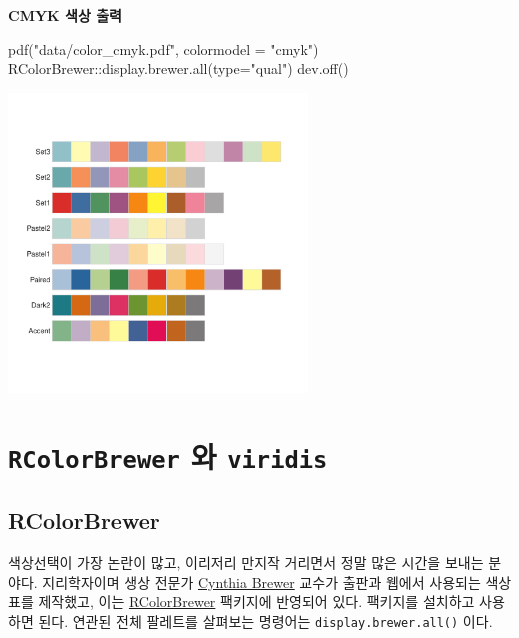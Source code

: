 \documentclass[
  letterpaper,
]{book}
\newenvironment{Shaded}{\begin{snugshade}}{\end{snugshade}}
\newcommand{\AttributeTok}[1]{\textcolor[rgb]{0.40,0.45,0.13}{#1}}
\newcommand{\FunctionTok}[1]{\textcolor[rgb]{0.28,0.35,0.67}{#1}}
\newcommand{\NormalTok}[1]{\textcolor[rgb]{0.00,0.23,0.31}{#1}}
\newcommand{\SpecialCharTok}[1]{\textcolor[rgb]{0.37,0.37,0.37}{#1}}
\newcommand{\StringTok}[1]{\textcolor[rgb]{0.13,0.47,0.30}{#1}}
\begin{document}
\textbf{CMYK 색상 출력}

\begin{Shaded}
\begin{Highlighting}[]
\FunctionTok{pdf}\NormalTok{(}\StringTok{"data/color\_cmyk.pdf"}\NormalTok{, }\AttributeTok{colormodel =} \StringTok{"cmyk"}\NormalTok{)}
\NormalTok{RColorBrewer}\SpecialCharTok{::}\FunctionTok{display.brewer.all}\NormalTok{(}\AttributeTok{type=}\StringTok{"qual"}\NormalTok{)}
\FunctionTok{dev.off}\NormalTok{()}
\end{Highlighting}
\end{Shaded}

\includegraphics[width=3.125in,height=3.125in]{data/color_cmyk.pdf}

\hypertarget{dataviz-color-brewer-viridis}{%
\section{\texorpdfstring{\texttt{RColorBrewer} 와
\texttt{viridis}}{RColorBrewer 와 viridis}}\label{dataviz-color-brewer-viridis}}

\hypertarget{dataviz-color-brewer}{%
\subsection{RColorBrewer}\label{dataviz-color-brewer}}

색상선택이 가장 논란이 많고, 이리저리 만지작 거리면서 정말 많은 시간을
보내는 분야다. 지리학자이며 생상 전문가
\href{http://en.wikipedia.org/wiki/Cynthia_Brewer}{Cynthia Brewer}
교수가 출판과 웹에서 사용되는 색상표를 제작했고, 이는
\href{http://cran.r-project.org/web/packages/RColorBrewer/index.html}{RColorBrewer}
팩키지에 반영되어 있다. 팩키지를 설치하고 사용하면 된다. 연관된 전체
팔레트를 살펴보는 명령어는 \texttt{display.brewer.all()} 이다.
\end{document}
